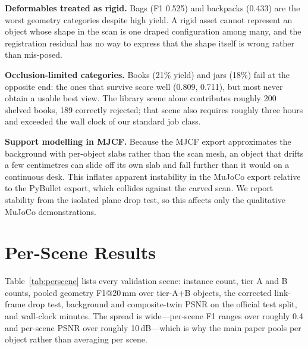 \textbf{Deformables treated as rigid.} Bags (F1 0.525) and backpacks
(0.433) are the worst geometry categories despite high yield. A rigid
asset cannot represent an object whose shape in the scan is one draped
configuration among many, and the registration residual has no way to
express that the shape itself is wrong rather than mis-posed.

\textbf{Occlusion-limited categories.} Books (21\% yield) and jars (18\%)
fail at the opposite end: the ones that survive score well (0.809, 0.711),
but most never obtain a usable best view. The library scene alone
contributes roughly 200 shelved books, 189 correctly rejected; that scene
also requires roughly three hours and exceeded the wall clock of our
standard job class.

\textbf{Support modelling in MJCF.} Because the MJCF export approximates
the background with per-object slabs rather than the scan mesh, an object
that drifts a few centimetres can slide off its own slab and fall further
than it would on a continuous desk. This inflates apparent instability in
the MuJoCo export relative to the PyBullet export, which collides against
the carved scan. We report stability from the isolated plane drop test, so
this affects only the qualitative MuJoCo demonstrations.

\section{Per-Scene Results}
\label{app:perscene}
Table~\ref{tab:perscene} lists every validation scene: instance count,
tier A and B counts, pooled geometry F1@20\,mm over tier-A+B objects, the
corrected link-frame drop test, background and composite-twin PSNR on the
official test split, and wall-clock minutes. The spread is wide---per-scene
F1 ranges over roughly 0.4 and per-scene PSNR over roughly 10\,dB---which
is why the main paper pools per object rather than averaging per scene.

\begin{table}[htbp]
\caption{Per-scene results, GT-driven mode, all 50 ScanNet++ validation
scenes. \emph{stab.} is the corrected link-frame drop test (stable/tested);
\emph{bg/twin} is background and composite PSNR on the official test split.}
\label{tab:perscene}
\centering\scriptsize

\end{table}

